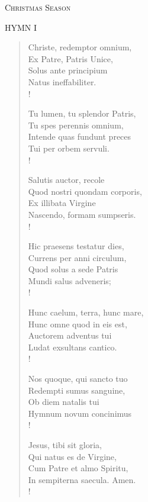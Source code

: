 \begin{center}\noindent\textsc{\small{Christmas Season\\}}\end{center}

\small{\uppercase{Hymn I}}\normalsize
\label{christmas:firstHymn}
\begin{verse}
Christe, redemptor omnium,\\
Ex Patre, Patris Unice,\\
Solus ante principium\\
Natus ineffabiliter.\\!

Tu lumen, tu splendor Patris,\\
Tu spes perennis omnium,\\
Intende quas fundunt preces\\
Tui per orbem servuli.\\!

Salutis auctor, recole\\
Quod nostri quondam corporis,\\
Ex illibata Virgine\\
Nascendo, formam sumpseris.\\!

Hic praesens testatur dies,\\
Currens per anni circulum,\\
Quod solus a sede Patris\\
Mundi salus adveneris;\\!

Hunc caelum, terra, hunc mare,\\
Hunc omne quod in eis est,\\
Auctorem adventus tui\\
Ludat exsultans cantico.\\!

Nos quoque, qui sancto tuo\\
Redempti sumus sanguine,\\
Ob diem natalis tui\\
Hymnum novum concinimus\\!

Jesus, tibi sit gloria,\\
Qui natus es de Virgine,\\
Cum Patre et almo Spiritu,\\
In sempiterna saecula. Amen.\\!
\end{verse}

